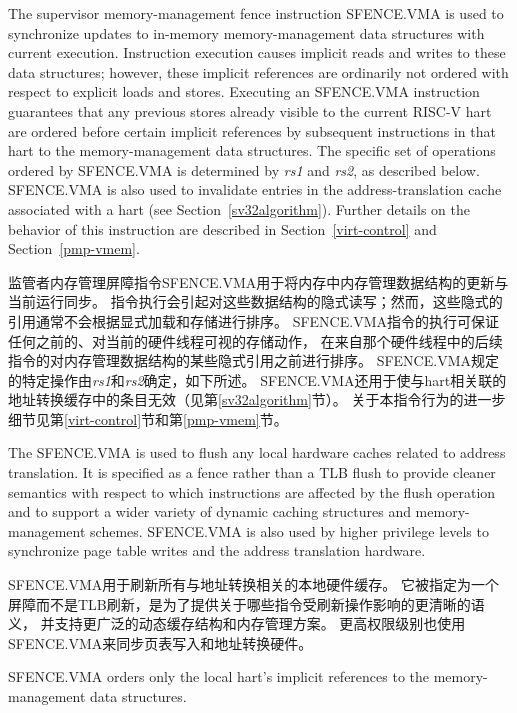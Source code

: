 The supervisor memory-management fence instruction SFENCE.VMA is used to
synchronize updates to in-memory memory-management data structures with
current execution.  Instruction execution causes implicit reads and writes to
these data structures; however, these implicit references are ordinarily not
ordered with respect to explicit loads and stores.  Executing
an SFENCE.VMA instruction guarantees that any previous stores already visible
to the current RISC-V hart are ordered before certain implicit references by
subsequent instructions in that hart to the memory-management data structures.
The specific set of operations ordered by SFENCE.VMA is
determined by {\em rs1} and {\em rs2}, as described below.
SFENCE.VMA is also used to invalidate entries in the
address-translation cache associated with a hart (see
Section~\ref{sv32algorithm}).
Further details on the behavior of this instruction are
described in Section~\ref{virt-control} and Section~\ref{pmp-vmem}.

监管者内存管理屏障指令SFENCE.VMA用于将内存中内存管理数据结构的更新与当前运行同步。
指令执行会引起对这些数据结构的隐式读写；然而，这些隐式的引用通常不会根据显式加载和存储进行排序。
SFENCE.VMA指令的执行可保证任何之前的、对当前的硬件线程可视的存储动作，
在来自那个硬件线程中的后续指令的对内存管理数据结构的某些隐式引用之前进行排序。
SFENCE.VMA规定的特定操作由{\em rs1}和{\em rs2}确定，如下所述。
SFENCE.VMA还用于使与hart相关联的地址转换缓存中的条目无效（见第\ref{sv32algorithm}节）。
关于本指令行为的进一步细节见第\ref{virt-control}节和第\ref{pmp-vmem}节。

\begin{commentary}
The SFENCE.VMA is used to flush any local hardware caches related to
address translation.  It is specified as a fence rather than a TLB
flush to provide cleaner semantics with respect to which instructions
are affected by the flush operation and to support a wider variety of
dynamic caching structures and memory-management schemes.  SFENCE.VMA
is also used by higher privilege levels to synchronize page table
writes and the address translation hardware.

SFENCE.VMA用于刷新所有与地址转换相关的本地硬件缓存。
它被指定为一个屏障而不是TLB刷新，是为了提供关于哪些指令受刷新操作影响的更清晰的语义，
并支持更广泛的动态缓存结构和内存管理方案。
更高权限级别也使用SFENCE.VMA来同步页表写入和地址转换硬件。
\end{commentary}
SFENCE.VMA orders only the local hart's implicit references to the
memory-management data structures.

